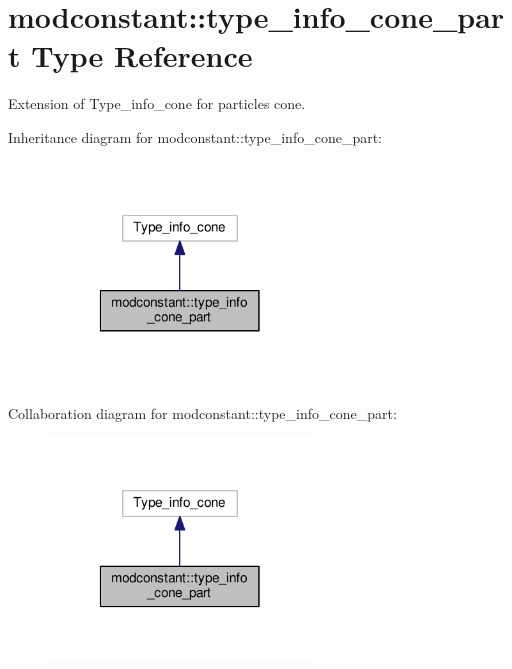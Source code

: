 \hypertarget{structmodconstant_1_1type__info__cone__part}{\section{modconstant\-:\-:type\-\_\-info\-\_\-cone\-\_\-part Type Reference}
\label{structmodconstant_1_1type__info__cone__part}
}


Extension of Type\-\_\-info\-\_\-cone for particles cone.  




Inheritance diagram for modconstant\-:\-:type\-\_\-info\-\_\-cone\-\_\-part\-:\nopagebreak
\begin{figure}[H]
\begin{center}
\leavevmode
\includegraphics[width=198pt]{structmodconstant_1_1type__info__cone__part__inherit__graph}
\end{center}
\end{figure}


Collaboration diagram for modconstant\-:\-:type\-\_\-info\-\_\-cone\-\_\-part\-:\nopagebreak
\begin{figure}[H]
\begin{center}
\leavevmode
\includegraphics[width=198pt]{structmodconstant_1_1type__info__cone__part__coll__graph}
\end{center}
\end{figure}
